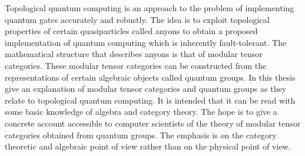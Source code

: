 Topological quantum computing is an approach to the problem of implementing
quantum gates accurately and robustly. The idea is to exploit topological
properties of certain quasiparticles called anyons to obtain a proposed
implementation of quantum computing which is inherently fault-tolerant. The
mathematical structure that describes anyons is that of modular tensor
categories. These modular tensor categories can be constructed from the
representations of certain algebraic objects called quantum groups. In this
thesis give an explanation of modular tensor categories and quantum groups as
they relate to topological quantum computing. It is intended that it can be
read with some basic knowledge of algebra and category theory.  The hope is to
give a concrete account accessible to computer
scientists of the theory of modular tensor categories obtained from quantum
groups. The emphasis is on the category theoretic and algebraic point of view
rather than on the physical point of view. 
